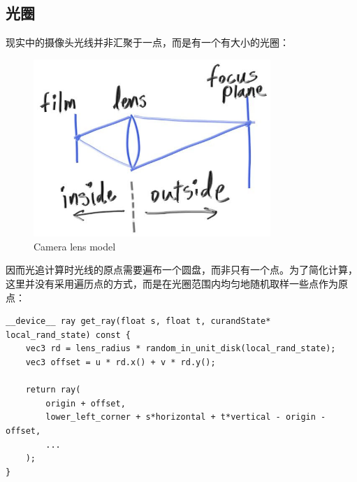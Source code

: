 \documentclass[UTF8, a4paper, 11pt]{article}
\begin{document}
\subsection{光圈}
现实中的摄像头光线并非汇聚于一点，而是有一个有大小的光圈：
\begin{figure}[H]
    \centering
    \includegraphics[width=0.8\textwidth]{cam-lens.jpg}
    \caption{Camera lens model}
\end{figure}
因而光追计算时光线的原点需要遍布一个圆盘，而非只有一个点。为了简化计算，这里并没有采用遍历点的方式，而是在光圈范围内均匀地随机取样一些点作为原点：
\begin{lstlisting}
__device__ ray get_ray(float s, float t, curandState* local_rand_state) const {
    vec3 rd = lens_radius * random_in_unit_disk(local_rand_state);
    vec3 offset = u * rd.x() + v * rd.y();

    return ray(
        origin + offset,
        lower_left_corner + s*horizontal + t*vertical - origin - offset,
        ...
    );
}
\end{lstlisting}
\end{document}
